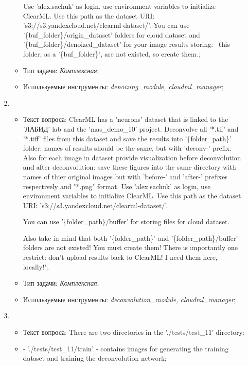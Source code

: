 \begin{enumerate}
\begin{itemize}
Use 'alex.sachuk' as login, use environment variables to initialize ClearML.
Use this path as the dataset URI: 's3://s3.yandexcloud.net/clearml-dataset/'.
You can use '\{buf\_folder\}/origin\_dataset' folders for cloud dataset and 
'\{buf\_folder\}/denoized\_dataset' for your image results storing: \
this folder, as a '\{buf\_folder\}', are not existed, so create them.;
		\item Тип задачи: \textit{Комплексная};
		\item Используемые инструменты: \textit{denoizing\_module, cloudml\_manager};
	\end{itemize}

	\item \begin{itemize}
		\item Текст вопроса: ClearML has a 'neurons' dataset that is linked to the 'ЛАБИД' lab and the 
'mas\_demo\_10' project.
Deconvolve all '*.tif' and '*.tiff' files from this dataset and
save the results into '\{folder\_path\}' folder: names of results should be the same, but with 'deconv-' prefix.
Also for each image in dataset provide visualization before deconvolution 
and after deconvolution: save these figures into the same directory with names of thier original images
but with 'before-' and 'after-' prefixes respectively and "*.png" format.
Use 'alex.sachuk' as login, use environment variables to initialize ClearML.
Use this path as the dataset URI: 's3://s3.yandexcloud.net/clearml-dataset/'.
											
You can use '\{folder\_path\}/buffer' for storing files for cloud dataset.
											
Also take in mind that both '\{folder\_path\}' and '\{folder\_path\}/buffer' folders are not existed! 
You must create them!
There is importantly one restrict: don't upload results back to ClearML! I need them here, locally!";
		\item Тип задачи: \textit{Комплексная};
		\item Используемые инструменты: \textit{deconvolution\_module, cloudml\_manager};
	\end{itemize}

	\item \begin{itemize}
		\item Текст вопроса: There are two directories in the './tests/test\_11' directory:
		\item 
 - './tests/test\_11/train' - contains images for generating the training dataset and training 
 the deconvolution network;


\end{itemize}
\end{enumerate}
